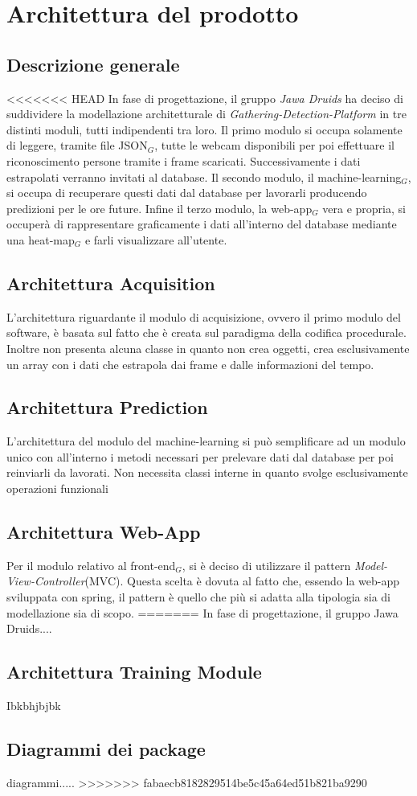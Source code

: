 \chapter{Architettura del prodotto}\label{ArchitetturaDelProdotto}

\section{Descrizione generale}
<<<<<<< HEAD
In fase di progettazione, il gruppo \textit{Jawa Druids} ha deciso di suddividere la modellazione architetturale di \textit{Gathering-Detection-Platform} in tre distinti moduli, tutti indipendenti tra loro.
Il primo modulo si occupa solamente di leggere, tramite file JSON$_G$, tutte le webcam disponibili per poi effettuare il riconoscimento persone tramite i frame scaricati. Successivamente i dati estrapolati verranno invitati al database.
Il secondo modulo, il machine-learning$_G$, si occupa di recuperare questi dati dal database per lavorarli producendo predizioni per le ore future.
Infine il terzo modulo, la web-app$_G$ vera e propria, si occuperà di rappresentare graficamente i dati all'interno del database mediante una heat-map$_G$ e farli visualizzare all'utente.

\section{Architettura Acquisition}\label{ArchitetturaDelProdottoAcquisition}
L'architettura riguardante il modulo di acquisizione, ovvero il primo modulo del software, è basata sul fatto che è creata sul paradigma della codifica procedurale.
Inoltre non presenta alcuna classe in quanto non crea oggetti, crea esclusivamente un array con i dati che estrapola dai frame e dalle informazioni del tempo.

\section{Architettura Prediction}\label{ArchitetturaDelProdottoPrediction}
L'architettura del modulo del machine-learning si può semplificare ad un modulo unico con all'interno i metodi necessari per prelevare dati dal database per poi reinviarli da lavorati.
Non necessita classi interne in quanto svolge esclusivamente operazioni funzionali


\section{Architettura Web-App}\label{ArchitetturaDelProdottoWebApp}
Per il modulo relativo al front-end$_G$, si è deciso di utilizzare il pattern \textit{Model-View-Controller}(MVC).
Questa scelta è dovuta al fatto che, essendo la web-app sviluppata con spring, il pattern è quello che più si adatta alla tipologia sia di modellazione sia di scopo.
=======
In fase di progettazione, il gruppo Jawa Druids.... 
\section{Architettura Training Module}
Ibkbhjbjbk
\section{Diagrammi dei package}
diagrammi.....
>>>>>>> fabaecb8182829514be5c45a64ed51b821ba9290
